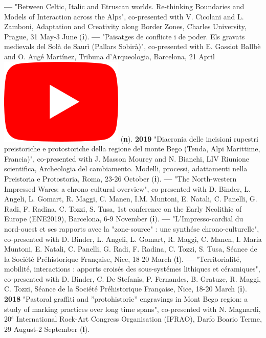 \documentclass{article}
\begin{document}
\smallbreak
\textbf{--- }"Between Celtic, Italic and Etruscan worlds. Re-thinking Boundaries and Models of Interaction across the Alps", co-presented with V. Cicolani and L. Zamboni, Adaptation and Creativity along Border Zones, Charles University, Prague, 31 May-3 June (\textbf{i}).
\smallbreak
\textbf{--- }"Paisatges de conflicte i de poder. Els gravats medievals del Sol\`{a} de Saur\`{i} (Pallars Sobir\`{a})", co-presented with E. Gassiot Ballb\`{e} and O. Aug\'{e} Mart\'{i}nez, Tribuna d'Arqueologia, Barcelona, 21 April \href{https://www.youtube.com/watch?v=4b7gLw4NV_E}{\includegraphics[scale=0.2]{icon_youtube}} (\textbf{n}).
\smallbreak
\textbf{2019 }"Diacronia delle incisioni rupestri preistoriche e protostoriche della regione del monte Bego (Tenda, Alpi Marittime, Francia)", co-presented with J. Masson Mourey and N. Bianchi, LIV Riunione scientifica, Archeologia del cambiamento. Modelli, processi, adattamenti nella Preistoria e Protostoria, Roma, 23-26 October (\textbf{i}).
\smallbreak
\textbf{--- }"The North-western Impressed Wares: a chrono-cultural overview", co-presented with D. Binder, L. Angeli, L. Gomart, R. Maggi, C. Manen, I.M. Muntoni, E. Natali, C. Panelli, G. Radi, F. Radina, C. Tozzi, S. Tusa, 1st conference on the Early Neolithic of Europe (ENE2019), Barcelona, 6-9 November (\textbf{i}).
\smallbreak
\textbf{--- }"L'Impresso-cardial du nord-ouest et ses rapports avec la "zone-source" : une synth\'{e}se chrono-culturelle", co-presented with D. Binder, L. Angeli, L. Gomart, R. Maggi, C. Manen, I. Maria Muntoni, E. Natali, C. Panelli, G. Radi, F. Radina, C. Tozzi, S. Tusa, S\'{e}ance de la Soci\'{e}t\'{e} Pr\'{e}historique Fran\c{c}aise, Nice, 18-20 March (\textbf{i}).
\smallbreak
\textbf{--- }"Territorialit\'{e}, mobilit\'{e}, interactions : apports crois\'{e}s des sous-syst\'{e}mes lithiques et c\'{e}ramiques", co-presented with D. Binder, C. De Stefanis, P. Fernandes, B. Gratuze, R. Maggi, C. Tozzi, S\'{e}ance de la Soci\'{e}t\'{e} Pr\'{e}historique Fran\c{c}aise, Nice, 18-20 March (\textbf{i}).
\smallbreak
\textbf{2018 }"Pastoral graffiti and ''protohistoric'' engravings in Mont Bego region: a study of marking practices over long time spans", co-presented with N. Magnardi, 20${}^{e}$ International Rock-Art Congress Organisation (IFRAO), Darfo Boario Terme, 29 August-2 September (\textbf{i}).
\end{document}
